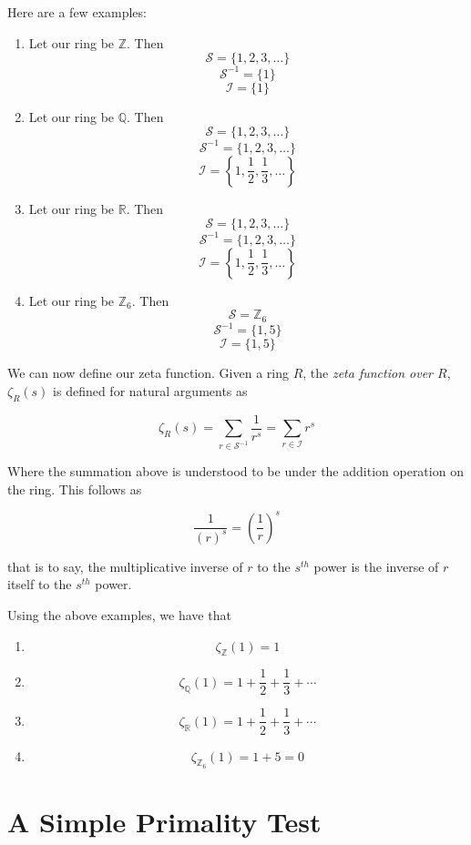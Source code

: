 \documentclass{amsart}
\begin{document}
Here are a few examples: 

\begin{enumerate}
	\item Let our ring be \(\mathbb{Z}\). Then 
	\[\mathcal{S}=\{1,2,3,\ldots\}\]
	\[\mathcal{S}^{-1}=\{1\}\]
	\[\mathcal{I}=\{1\}\]
	\item Let our ring be \(\mathbb{Q}\). Then
	\[\mathcal{S}=\{1,2,3,\ldots\}\]
	\[\mathcal{S}^{-1}=\{1,2,3,\ldots\}\]
	\[\mathcal{I}=\left\{1,\frac{1}{2},\frac{1}{3},\ldots\right\}\]
	\item Let our ring be \(\mathbb{R}\). Then
	\[\mathcal{S}=\{1,2,3,\ldots\}\]
	\[\mathcal{S}^{-1}=\{1,2,3,\ldots\}\]
	\[\mathcal{I}=\left\{1,\frac{1}{2},\frac{1}{3},\ldots\right\}\]
	\item Let our ring be \(\mathbb{Z}_6\). Then
	\[\mathcal{S}=\mathbb{Z}_6\]
	\[\mathcal{S}^{-1}=\{1,5\}\]
	\[\mathcal{I}=\{1,5\}\]
\end{enumerate}

We can now define our zeta function. Given a ring \(R\), the \textit{zeta function over \(R\)}, \(\zeta_{R}(s)\) is defined for natural arguments as

\[\zeta_{R}(s)=\sum_{r\in\mathcal{S}^{-1}}\frac{1}{r^s}=\sum_{r\in\mathcal{I}}r^s\]

Where the summation above is understood to be under the addition operation on the ring. This follows as

\[\frac{1}{(r)^s}=\left(\frac{1}{r}\right)^s\]

that is to say, the multiplicative inverse of \(r\) to the \(s^{th}\) power is the inverse of \(r\) itself to the \(s^{th}\) power.

Using the above examples, we have that

\begin{enumerate}
	\item \[\zeta_{\mathbb{Z}}(1)=1\]
	\item \[\zeta_{\mathbb{Q}}(1)=1+\frac{1}{2}+\frac{1}{3}+\cdots\]
	\item \[\zeta_{\mathbb{R}}(1)=1+\frac{1}{2}+\frac{1}{3}+\cdots\]
	\item \[\zeta_{\mathbb{Z}_6}(1)=1+5=0\]
\end{enumerate}

\hfill\break

\section{A Simple Primality Test}
\end{document}
